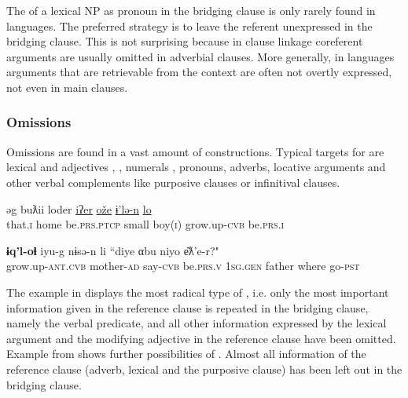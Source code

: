 \documentclass[output=paper]{LSP/langsci}
\begin{document}
The  of a lexical NP as pronoun in the bridging clause is only rarely found in  languages. The preferred strategy is to leave the referent unexpressed in the bridging clause. This is not surprising because in clause linkage coreferent arguments are usually omitted in adverbial clauses. More generally, in  languages arguments that are retrievable from the context are often not overtly expressed, not even in main clauses.  

\subsubsection{Omissions}
\label{ssec:Omissions}

Omissions are found in a vast amount of  constructions. Typical targets for  are lexical  and adjectives , , numerals , pronouns, adverbs, locative arguments  and other verbal complements like purposive clauses  or infinitival clauses.

\begin{exe}
	\ex	\label{ex:8ab}
	\begin{xlist}
		\ex	\label{ex:8a}
		\gll	əg			buƛii		loder					\underline{iʔer}	\underline{ože}	\underline{ɨ'lə-n}			\underline{lo}\\
			that.\textsc{i}		home		be.\textsc{prs.ptcp}		small	boy(\textsc{i})	grow.up-\textsc{cvb}	be.\textsc{prs.i}\\
		\glt	{}

		\ex	\label{ex:8b}
		\gll	\textbf{ɨq'l-oɬ}					iyu-g			nɨsə-n	li				``diye αbu		niyo		e͂ƛ'e-r?" \\
			grow.up-\textsc{ant.cvb}	mother-\textsc{ad}	say-\textsc{cvb}	be.\textsc{prs.v}		\textsc{1sg.gen} father		where	go-\textsc{pst}\\
		\glt	{} 
	\end{xlist}
\end{exe}

The example in  displays the most radical type of , i.e. only the most important information given in the reference clause is repeated in the bridging clause, namely the verbal predicate, and all other information expressed by the lexical argument and the modifying adjective in the reference clause have been omitted. Example  from  shows further possibilities of . Almost all information of the reference clause (adverb, lexical  and the purposive clause) has been left out in the bridging clause. 
\end{document}
